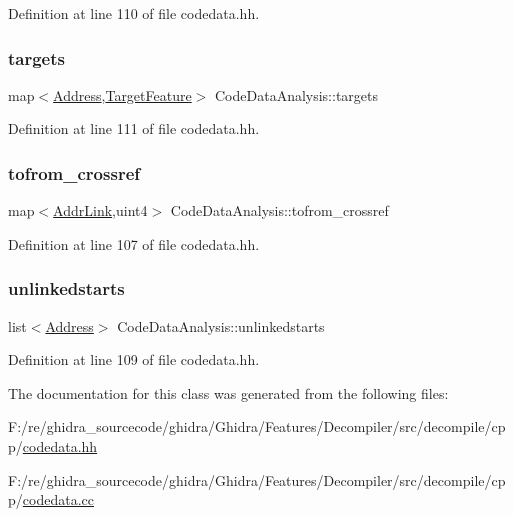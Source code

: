 Definition at line 110 of file codedata.\+hh.

\mbox{\label{class_code_data_analysis_a07bd461ce70fb7e87a8f8e62378ca857}} 
\subsubsection{\texorpdfstring{targets}{targets}}
{\footnotesize\ttfamily map$<$\mbox{\hyperlink{class_address}{Address}},\mbox{\hyperlink{struct_target_feature}{Target\+Feature}}$>$ Code\+Data\+Analysis\+::targets}



Definition at line 111 of file codedata.\+hh.

\mbox{\label{class_code_data_analysis_ac284b65ea4121cecbeeac54fdb466cee}} 
\subsubsection{\texorpdfstring{tofrom\_crossref}{tofrom\_crossref}}
{\footnotesize\ttfamily map$<$\mbox{\hyperlink{struct_addr_link}{Addr\+Link}},uint4$>$ Code\+Data\+Analysis\+::tofrom\+\_\+crossref}



Definition at line 107 of file codedata.\+hh.

\mbox{\label{class_code_data_analysis_a3d2f7273689a3802d8b2aa615c6352a5}} 
\subsubsection{\texorpdfstring{unlinkedstarts}{unlinkedstarts}}
{\footnotesize\ttfamily list$<$\mbox{\hyperlink{class_address}{Address}}$>$ Code\+Data\+Analysis\+::unlinkedstarts}



Definition at line 109 of file codedata.\+hh.



The documentation for this class was generated from the following files\+:\begin{DoxyCompactItemize}
\item 
F\+:/re/ghidra\+\_\+sourcecode/ghidra/\+Ghidra/\+Features/\+Decompiler/src/decompile/cpp/\mbox{\hyperlink{codedata_8hh}{codedata.\+hh}}\item 
F\+:/re/ghidra\+\_\+sourcecode/ghidra/\+Ghidra/\+Features/\+Decompiler/src/decompile/cpp/\mbox{\hyperlink{codedata_8cc}{codedata.\+cc}}\end{DoxyCompactItemize}

